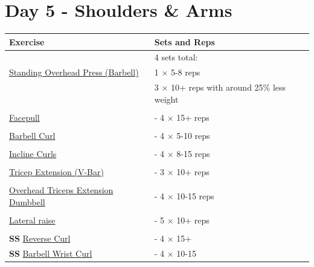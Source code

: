 \documentclass[11pt]{article}
\begin{document}
\section*{Day 5 - Shoulders \& Arms}
\begin{center}
\begin{tabular}{|l|l|}
\hline
\textbf{Exercise} & \textbf{Sets and Reps}\\
\hline
& 4 sets total: \\
\href{https://www.youtube.com/watch?v=OSJsEPfEcU0}{Standing Overhead Press (Barbell)} & 1 $\times$ 5-8 reps \\
& 3 $\times$ 10+ reps with around 25\% less weight \\
\hline
&\\
\href{https://www.youtube.com/watch?v=eFxMixk_qPQ}{Facepull} & - 4 $\times$ 15+ reps \\
\hline
&\\
\href{https://www.youtube.com/watch?v=bAWLx7PPK10}{Barbell Curl} & - 4 $\times$ 5-10 reps \\
\hline
&\\
\href{https://www.youtube.com/watch?v=soxrZlIl35U}{Incline Curls} & - 4 $\times$ 8-15 reps\\
\hline
&\\
\href{https://www.youtube.com/watch?v=cGi9eO3QnOA}{Tricep Extension (V-Bar)} & - 3 $\times$ 10+ reps \\
\hline
&\\
\href{https://www.youtube.com/watch?v=\_gsUck-7M74}{Overhead Triceps Extension Dumbbell} & - 4 $\times$ 10-15 reps \\
\hline
&\\
\href{https://www.youtube.com/watch?v=n5dsI9qQXwY}{Lateral raise} & - 5 $\times$ 10+ reps\\
\hline
&\\
\textbf{SS} \href{https://www.youtube.com/watch?v=eve_ZgHapkw}{Reverse Curl} & - 4 $\times$ 15+ \\
\textbf{SS} \href{https://www.youtube.com/watch?v=lfQR7oVS8eo}{Barbell Wrist Curl} & - 4  $\times$ 10-15 \\
\hline
\end{tabular}
\end{center}
\end{document}
